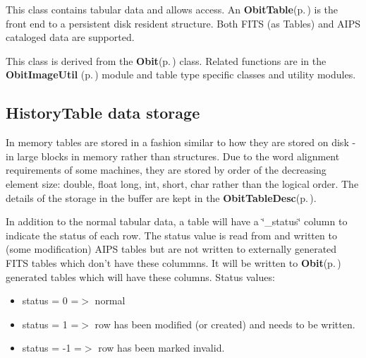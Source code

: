 This class contains tabular data and allows access. An {\bf Obit\-Table}{\rm (p.\,\pageref{structObitTable})} is the front end to a persistent disk resident structure. Both FITS (as Tables) and AIPS cataloged data are supported.

This class is derived from the {\bf Obit}{\rm (p.\,\pageref{structObit})} class. Related functions are in the {\bf Obit\-Image\-Util }{\rm (p.\,\pageref{ObitImageUtil_8h})} module and table type specific classes and utility modules.\subsection{History\-Table data storage}\label{ObitTableWX_8h_TableDataStorage}
In memory tables are stored in a fashion similar to how they are stored on disk - in large blocks in memory rather than structures. Due to the word alignment requirements of some machines, they are stored by order of the decreasing element size: double, float long, int, short, char rather than the logical order. The details of the storage in the buffer are kept in the {\bf Obit\-Table\-Desc}{\rm (p.\,\pageref{structObitTableDesc})}.

In addition to the normal tabular data, a table will have a \char`\"{}\_\-status\char`\"{} column to indicate the status of each row. The status value is read from and written to (some modification) AIPS tables but are not written to externally generated FITS tables which don't have these colummns. It will be written to {\bf Obit}{\rm (p.\,\pageref{structObit})} generated tables which will have these columns. Status values: \begin{itemize}
\item status = 0 =$>$ normal \item status = 1 =$>$ row has been modified (or created) and needs to be written. \item status = -1 =$>$ row has been marked invalid.\end{itemize}

